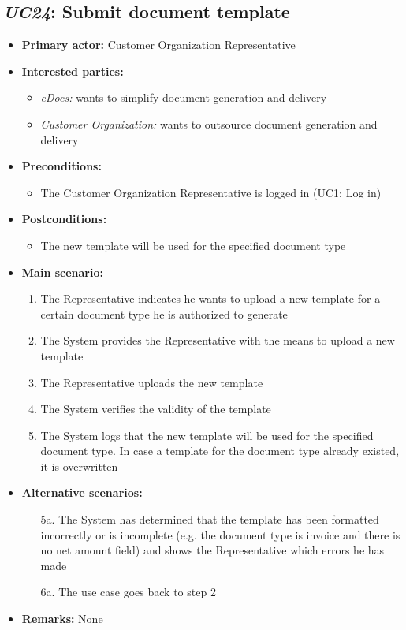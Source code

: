 \documentclass[a4paper,10pt]{article}
\begin{document}
\subsection{\emph{UC24}: Submit document template}
\begin{itemize}
	\item \textbf{Primary actor:} Customer Organization Representative
	\item \textbf{Interested parties:} 
	\begin{itemize}
		\item \textit{eDocs:} wants to simplify document generation and delivery
		\item \textit{Customer Organization:} wants to outsource document generation and delivery
	\end{itemize}
	
	\item \textbf{Preconditions:}
	\begin{itemize}
		\item The Customer Organization Representative is logged in (UC1: Log in)
	\end{itemize}
	
	\item \textbf{Postconditions:}
	\begin{itemize}
		\item The new template will be used for the specified document type
	\end{itemize}
	
	\item \textbf{Main scenario:} 
	\begin{enumerate}
		\item The Representative indicates he wants to upload a new template for a certain document type he is authorized to generate
		\item The System provides the Representative with the means to upload a new template
		\item The Representative uploads the new template
		\item The System verifies the validity of the template
		\item The System logs that the new template will be used for the specified document type. In case a template for the document type already existed, it is overwritten
	\end{enumerate}
	
	\item \textbf{Alternative scenarios:} 
	\begin{enumerate}
		\item [5a.] The System has determined that the template has been formatted incorrectly or is incomplete (e.g. the document type is invoice and there is no net amount field) and shows the Representative which errors he has made
		\item [6a.] The use case goes back to step 2
	\end{enumerate}
	
	\item \textbf{Remarks:}
	None
\end{itemize}
\end{document}
